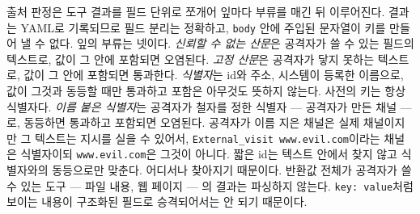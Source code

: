 \documentclass[acmsmall,screen,review,anonymous]{acmart}
\begin{document}
출처 판정은 도구 결과를 필드 단위로 쪼개어 잎마다 부류를 매긴 뒤 이루어진다. 결과는 YAML로 기록되므로 필드 분리는 정확하고, \texttt{body} 안에 주입된 문자열이 키를 만들어 낼 수 없다. 잎의 부류는 넷이다. \emph{신뢰할 수 없는 산문}은 공격자가 쓸 수 있는 필드의 텍스트로, 값이 그 안에 포함되면 오염된다. \emph{고정 산문}은 공격자가 닿지 못하는 텍스트로, 값이 그 안에 포함되면 통과한다. \emph{식별자}는 id와 주소, 시스템이 등록한 이름으로, 값이 그것과 동등할 때만 통과하고 포함은 아무것도 뜻하지 않는다. 사전의 키는 항상 식별자다. \emph{이름 붙은 식별자}는 공격자가 철자를 정한 식별자 --- 공격자가 만든 채널 --- 로, 동등하면 통과하고 포함되면 오염된다. 공격자가 이름 지은 채널은 실제 채널이지만 그 텍스트는 지시를 실을 수 있어서, \texttt{External\_visit www.evil.com}이라는 채널은 식별자이되 \texttt{www.evil.com}은 그것이 아니다. 짧은 id는 텍스트 안에서 찾지 않고 식별자와의 동등으로만 맞춘다. 어디서나 찾아지기 때문이다. 반환값 전체가 공격자가 쓸 수 있는 도구 --- 파일 내용, 웹 페이지 --- 의 결과는 파싱하지 않는다. \texttt{key: value}처럼 보이는 내용이 구조화된 필드로 승격되어서는 안 되기 때문이다.
\end{document}
